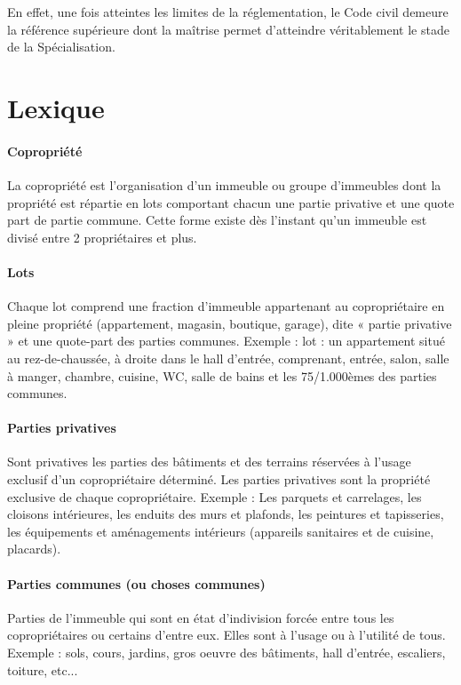 	En effet, une fois atteintes les limites de la réglementation, le Code civil demeure la référence supérieure dont la maîtrise permet d'atteindre véritablement le stade de la Spécialisation.

\section*{Lexique}

	\paragraph*{Copropriété}
	La copropriété est l'organisation d'un immeuble ou groupe d'immeubles dont la propriété est répartie en lots comportant chacun une partie privative et une quote part de partie commune. Cette forme existe dès l'instant qu'un immeuble est divisé entre 2 propriétaires et plus.
	
	\paragraph*{Lots}
	Chaque lot comprend une fraction d'immeuble appartenant au copropriétaire en pleine propriété (appartement, magasin, boutique, garage), dite « partie privative » et une quote-part des parties communes.
	Exemple : lot  : un appartement situé au rez-de-chaussée, à droite dans le hall d'entrée, comprenant, entrée, salon, salle à manger, chambre, cuisine, WC, salle de bains et les 75/1.000èmes des parties communes.
	
	\paragraph*{Parties privatives}
	Sont privatives les parties des bâtiments et des terrains réservées à l'usage exclusif d'un copropriétaire déterminé. Les parties privatives sont la propriété exclusive de chaque copropriétaire.
	Exemple : Les parquets et carrelages, les cloisons intérieures, les enduits des murs et plafonds, les peintures et tapisseries, les équipements et aménagements intérieurs (appareils sanitaires et de cuisine, placards).
	
	\paragraph*{Parties communes (ou choses communes)}
	Parties de l'immeuble qui sont en état d'indivision forcée entre tous les copropriétaires ou certains d'entre eux. Elles sont à l’usage ou à l’utilité de tous.
	Exemple : sols, cours, jardins, gros oeuvre des bâtiments, hall d'entrée, escaliers, toiture, etc...
	
